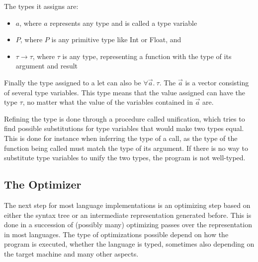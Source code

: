 \documentclass[12pt]{article}
\begin{document}
The types it assigns are:
\begin{itemize}
	\item $a$, where $a$ represents any type and is called a type variable
	\item $P$, where $P$ is any primitive type like Int or Float, and
	\item $\tau \rightarrow \tau$, where $\tau$ is any type, representing
	      a function with the type of its argument and result
\end{itemize}

Finally the type assigned to a let can also be
$\forall \vec{a}.\:\tau$. The $\vec{a}$ is a vector consisting of
several type variables. This type means that the value assigned
can have the type $\tau$, no matter what the value of the variables contained in $\vec{a}$ are.

Refining the type is done through a procedure called unification,
which tries to find possible substitutions for type variables that would make two
types equal. This is done for instance when inferring the type of a call,
as the type of the function being called must match
the type of its argument.
If there is no way to substitute type variables
to unify the two types, the program is not well-typed.

\subsection{The Optimizer}
The next step for most language implementations is an optimizing step based on
either the syntax tree or an intermediate representation generated before.
This is done in a succession of (possibly many) optimizing passes over the representation
in most languages. The type of optimizations
possible depend on how the program is executed, whether the language is typed,
sometimes also depending on the target machine and many other aspects.
\end{document}

